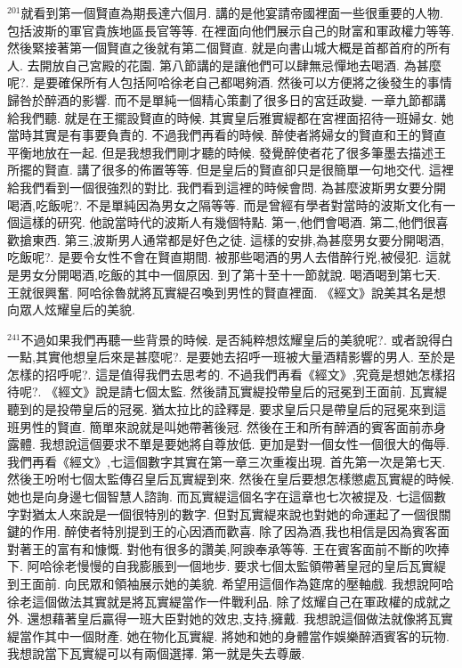 \documentclass{book}
\begin{document}
$^{201}$就看到第一個賢直為期長達六個月.
講的是他宴請帝國裡面一些很重要的人物.
包括波斯的軍官貴族地區長官等等.
在裡面向他們展示自己的財富和軍政權力等等.
然後緊接著第一個賢直之後就有第二個賢直.
就是向書山城大概是首都首府的所有人.
去開放自己宮殿的花園.
第八節講的是讓他們可以肆無忌憚地去喝酒.
為甚麼呢?.
是要確保所有人包括阿哈徐老自己都喝夠酒.
然後可以方便將之後發生的事情歸咎於醉酒的影響.
而不是單純一個精心策劃了很多日的宮廷政變.
一章九節都講給我們聽.
就是在王擺設賢直的時候.
其實皇后雅實緹都在宮裡面招待一班婦女.
她當時其實是有事要負責的.
不過我們再看的時候.
醉使者將婦女的賢直和王的賢直平衡地放在一起.
但是我想我們剛才聽的時候.
發覺醉使者花了很多筆墨去描述王所擺的賢直.
講了很多的佈置等等.
但是皇后的賢直卻只是很簡單一句地交代.
這裡給我們看到一個很強烈的對比.
我們看到這裡的時候會問.
為甚麼波斯男女要分開喝酒,吃飯呢?.
不是單純因為男女之隔等等.
而是曾經有學者對當時的波斯文化有一個這樣的研究.
他說當時代的波斯人有幾個特點.
第一,他們會喝酒.
第二,他們很喜歡搶東西.
第三,波斯男人通常都是好色之徒.
這樣的安排,為甚麼男女要分開喝酒,吃飯呢?.
是要令女性不會在賢直期間.
被那些喝酒的男人去借醉行兇,被侵犯.
這就是男女分開喝酒,吃飯的其中一個原因.
到了第十至十一節就說.
喝酒喝到第七天.
王就很興奮.
阿哈徐魯就將瓦實緹召喚到男性的賢直裡面.
《經文》說美其名是想向眾人炫耀皇后的美貌.

$^{241}$不過如果我們再聽一些背景的時候.
是否純粹想炫耀皇后的美貌呢?.
或者說得白一點,其實他想皇后來是甚麼呢?.
是要她去招呼一班被大量酒精影響的男人.
至於是怎樣的招呼呢?.
這是值得我們去思考的.
不過我們再看《經文》,究竟是想她怎樣招待呢?.
《經文》說是請七個太監.
然後請瓦實緹投帶皇后的冠冕到王面前.
瓦實緹聽到的是投帶皇后的冠冕.
猶太拉比的詮釋是.
要求皇后只是帶皇后的冠冕來到這班男性的賢直.
簡單來說就是叫她帶著後冠.
然後在王和所有醉酒的賓客面前赤身露體.
我想說這個要求不單是要她將自尊放低.
更加是對一個女性一個很大的侮辱.
我們再看《經文》,七這個數字其實在第一章三次重複出現.
首先第一次是第七天.
然後王吩咐七個太監傳召皇后瓦實緹到來.
然後在皇后要想怎樣懲處瓦實緹的時候.
她也是向身邊七個智慧人諮詢.
而瓦實緹這個名字在這章也七次被提及.
七這個數字對猶太人來說是一個很特別的數字.
但對瓦實緹來說也對她的命運起了一個很關鍵的作用.
醉使者特別提到王的心因酒而歡喜.
除了因為酒,我也相信是因為賓客面對著王的富有和慷慨.
對他有很多的讚美,阿諛奉承等等.
王在賓客面前不斷的吹捧下.
阿哈徐老慢慢的自我膨脹到一個地步.
要求七個太監領帶著皇冠的皇后瓦實緹到王面前.
向民眾和領袖展示她的美貌.
希望用這個作為筵席的壓軸戲.
我想說阿哈徐老這個做法其實就是將瓦實緹當作一件戰利品.
除了炫耀自己在軍政權的成就之外.
還想藉著皇后贏得一班大臣對她的效忠,支持,擁戴.
我想說這個做法就像將瓦實緹當作其中一個財產.
她在物化瓦實緹.
將她和她的身體當作娛樂醉酒賓客的玩物.
我想說當下瓦實緹可以有兩個選擇.
第一就是失去尊嚴.
\end{document}
